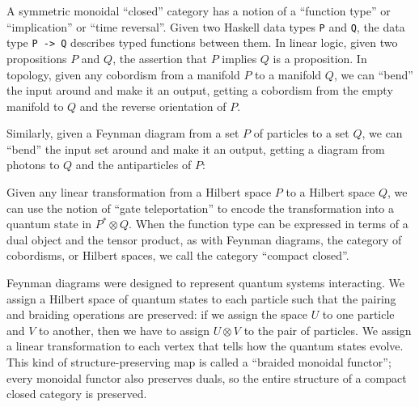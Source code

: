 \documentclass[12pt,twoside,openright]{report}
\newcommand{\identc}{
  \begin{scope}[left color=gray, right color=white]
    \shadedraw (.5,0) -- (.5,2.5) -- (-.5,2.5) -- (-.5,0) 
      .. controls (-.4,-.25) and (.4,-.25) .. (.5,0);
    \shadedraw (0,2.5) ellipse (.5 and .2);
  \end{scope}
  \draw[dashed] (0.5,0) arc (0:180:.5 and 0.2);
}
\newcommand{\zagc}{
  \begin{scope}[left color=gray, right color=white]
    \shadedraw (1.5,0) .. controls (1.6,2) and (-1.6,2) .. (-1.5,0)
      .. controls (-1.4,-.25) and (-.6,-.25) .. (-.5,0)
      .. controls (-.6,.8) and (0.6,.8) .. (.5,0)
      .. controls (.6,-.25) and (1.4,-.25) .. (1.5,0);
  \end{scope}
  \draw [dashed] (1.5, 0) arc (0:180:.5 and 0.2);
  \draw [dashed] (-.5, 0) arc (0:180:.5 and 0.2);
}
\begin{document}
A symmetric monoidal ``closed'' category has a notion of a ``function type'' or ``implication'' or ``time reversal''.  Given two Haskell data types {\tt P} and {\tt Q}, the data type {\tt P -> Q} describes typed functions between them.  In linear logic, given two propositions $P$ and $Q$, the assertion that $P$ implies $Q$ is a proposition.  In topology, given any cobordism from a manifold $P$ to a manifold $Q$, we can ``bend'' the input around and make it an output, getting a cobordism from the empty manifold to $Q$ and the reverse orientation of $P$.  
\begin{center}
\end{center}
Similarly, given a Feynman diagram from a set $P$ of particles to a set $Q$, we can ``bend'' the input set around and make it an output, getting a diagram from photons to $Q$ and the antiparticles of $P$:
\begin{center}
\end{center}
Given any linear transformation from a Hilbert space $P$ to a Hilbert space $Q$, we can use the notion of ``gate teleportation'' \cite{GC} to encode the transformation into a quantum state in $P^* \otimes Q.$  When the function type can be expressed in terms of a dual object and the tensor product, as with Feynman diagrams, the category of cobordisms, or Hilbert spaces, we call the category ``compact closed''.

Feynman diagrams were designed to represent quantum systems interacting.  We assign a Hilbert space of quantum states to each particle such that the pairing and braiding operations are preserved: if we assign the space $U$ to one particle and $V$ to another, then we have to assign $U \otimes V$ to the pair of particles.  We assign a linear transformation to each vertex that tells how the quantum states evolve.  This kind of structure-preserving map is called a ``braided monoidal functor''; every monoidal functor also preserves duals, so the entire structure of a compact closed category is preserved.
\end{document}
